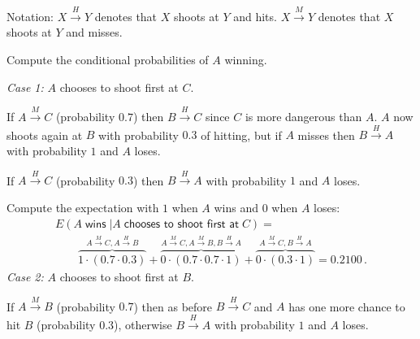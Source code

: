 Notation: $X\stackrel{H}{\longrightarrow}Y$ denotes that $X$ shoots at $Y$ and hits. $X\stackrel{M}{\longrightarrow}Y$ denotes that $X$ shoots at $Y$ and misses.

Compute the conditional probabilities of $A$ winning.

\textit{Case 1:} $A$ chooses to shoot first at $C$.

If $A\stackrel{M}{\longrightarrow}C$ (probability $0.7$) then $B\stackrel{H}{\longrightarrow}C$ since $C$ is more dangerous than $A$. $A$ now shoots again at $B$ with probability $0.3$ of hitting, but if $A$ misses then $B\stackrel{H}{\longrightarrow}A$ with probability $1$ and $A$ loses.

If $A\stackrel{H}{\longrightarrow}C$ (probability $0.3$) then $B\stackrel{H}{\longrightarrow}A$ with probability $1$ and $A$ loses.

Compute the expectation with $1$ when $A$ wins and $0$ when $A$ loses:
\vspace*{-3ex}
\[
\renewcommand*{\arraystretch}{2.5}
\begin{array}{l}
E(A \;\textsf{wins}\;|A\;\textsf{chooses to shoot first at}\;C) =\\
\qquad \overbrace{1\cdot (0.7\cdot 0.3)}^{A\stackrel{M}{\longrightarrow}C, A\stackrel{H}{\longrightarrow}B}+ \overbrace{0\cdot (0.7\cdot 0.7\cdot 1)}^{A\stackrel{M}{\longrightarrow}C, A\stackrel{M}{\longrightarrow}B, B\stackrel{H}{\longrightarrow}A}+ \overbrace{0\cdot (0.3\cdot 1)}^{A\stackrel{M}{\longrightarrow}C, B\stackrel{H}{\longrightarrow}A}=0.2100\,.
\end{array}
\]
\textit{Case 2:} $A$ chooses to shoot first at $B$.

If $A\stackrel{M}{\longrightarrow}B$ (probability $0.7$) then as before $B\stackrel{H}{\longrightarrow}C$ and $A$ has one more chance to hit $B$ (probability $0.3$), otherwise $B\stackrel{H}{\longrightarrow}A$ with probability $1$ and $A$ loses.

